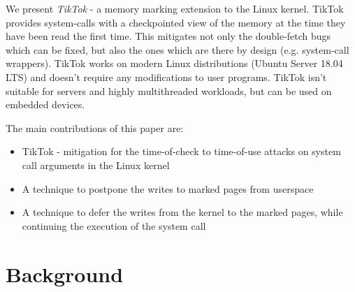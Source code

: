 We present \emph{TikTok} - a memory marking extension to the Linux kernel. TikTok
provides system-calls with a checkpointed view of the memory at the time they
have been read the first time. This mitigates not only the double-fetch bugs
which can be fixed, but also the ones which are there by design (e.g. system-call
wrappers). TikTok works on modern Linux distributions (Ubuntu Server 18.04 LTS)
and doesn't require any modifications to user programs. TikTok isn't suitable
for servers and highly multithreaded workloads, but can be used on embedded
devices.

The main contributions of this paper are:
\begin{itemize}
\item TikTok - mitigation for the time-of-check to time-of-use attacks on system 
      call arguments in the Linux kernel
\item A technique to postpone the writes to marked pages from userspace
\item A technique to defer the writes from the kernel to the marked pages,
      while continuing the execution of the system call
\end{itemize}




\section{Background}
\label{sec:background}

